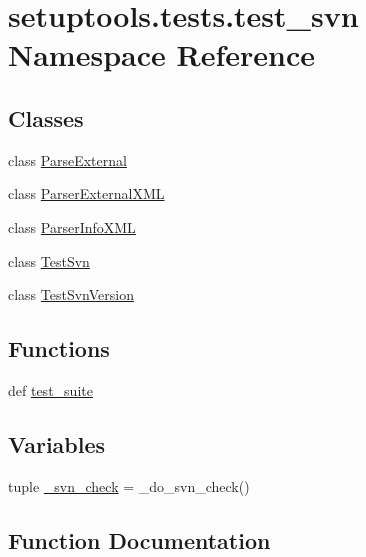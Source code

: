 \hypertarget{namespacesetuptools_1_1tests_1_1test__svn}{}\section{setuptools.\+tests.\+test\+\_\+svn Namespace Reference}
\label{namespacesetuptools_1_1tests_1_1test__svn}
\subsection*{Classes}
\begin{DoxyCompactItemize}
\item 
class \hyperlink{classsetuptools_1_1tests_1_1test__svn_1_1ParseExternal}{Parse\+External}
\item 
class \hyperlink{classsetuptools_1_1tests_1_1test__svn_1_1ParserExternalXML}{Parser\+External\+X\+M\+L}
\item 
class \hyperlink{classsetuptools_1_1tests_1_1test__svn_1_1ParserInfoXML}{Parser\+Info\+X\+M\+L}
\item 
class \hyperlink{classsetuptools_1_1tests_1_1test__svn_1_1TestSvn}{Test\+Svn}
\item 
class \hyperlink{classsetuptools_1_1tests_1_1test__svn_1_1TestSvnVersion}{Test\+Svn\+Version}
\end{DoxyCompactItemize}
\subsection*{Functions}
\begin{DoxyCompactItemize}
\item 
def \hyperlink{namespacesetuptools_1_1tests_1_1test__svn_a09ecda84340b52b381c561f099533551}{test\+\_\+suite}
\end{DoxyCompactItemize}
\subsection*{Variables}
\begin{DoxyCompactItemize}
\item 
tuple \hyperlink{namespacesetuptools_1_1tests_1_1test__svn_a3c2da10e14d46900afab31e29ebff405}{\+\_\+svn\+\_\+check} = \+\_\+do\+\_\+svn\+\_\+check()
\end{DoxyCompactItemize}


\subsection{Function Documentation}
\hypertarget{namespacesetuptools_1_1tests_1_1test__svn_a09ecda84340b52b381c561f099533551}{}
